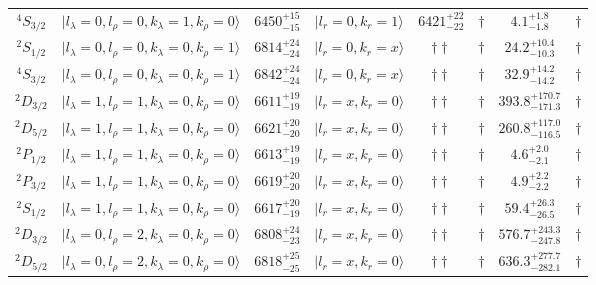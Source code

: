 \begin{tabular}{c| c c c c c c c}
$^{4}S_{3/2}$ & $\vert l_{\lambda}\!\!=\!0, l_{\rho}\!\!=\!0, k_{\lambda}\!\!=\!1, k_{\rho}\!\!=\!0 \rangle$ & $6450^{+15}_{-15}$ & $\vert l_r\!\!=\!0, k_r\!\!=\!1 \rangle$ & $6421^{+22}_{-22}$ & $\dagger$ & $4.1^{+1.8}_{-1.8}$ & $\dagger$ \\ 
$^{2}S_{1/2}$ & $\vert l_{\lambda}\!\!=\!0, l_{\rho}\!\!=\!0, k_{\lambda}\!\!=\!0, k_{\rho}\!\!=\!1 \rangle$ & $6814^{+24}_{-24}$ & $\vert l_r\!\!=\!0, k_r\!\!=\!x \rangle$ & $\dagger\dagger$ & $\dagger$ & $24.2^{+10.4}_{-10.3}$ & $\dagger$ \\ 
$^{4}S_{3/2}$ & $\vert l_{\lambda}\!\!=\!0, l_{\rho}\!\!=\!0, k_{\lambda}\!\!=\!0, k_{\rho}\!\!=\!1 \rangle$ & $6842^{+24}_{-24}$ & $\vert l_r\!\!=\!0, k_r\!\!=\!x \rangle$ & $\dagger\dagger$ & $\dagger$ & $32.9^{+14.2}_{-14.2}$ & $\dagger$ \\ 
$^{2}D_{3/2}$ & $\vert l_{\lambda}\!\!=\!1, l_{\rho}\!\!=\!1, k_{\lambda}\!\!=\!0, k_{\rho}\!\!=\!0 \rangle$ & $6611^{+19}_{-19}$ & $\vert l_r\!\!=\!x, k_r\!\!=\!0 \rangle$ & $\dagger\dagger$ & $\dagger$ & $393.8^{+170.7}_{-171.3}$ & $\dagger$ \\ 
$^{2}D_{5/2}$ & $\vert l_{\lambda}\!\!=\!1, l_{\rho}\!\!=\!1, k_{\lambda}\!\!=\!0, k_{\rho}\!\!=\!0 \rangle$ & $6621^{+20}_{-20}$ & $\vert l_r\!\!=\!x, k_r\!\!=\!0 \rangle$ & $\dagger\dagger$ & $\dagger$ & $260.8^{+117.0}_{-116.5}$ & $\dagger$ \\ 
$^{2}P_{1/2}$ & $\vert l_{\lambda}\!\!=\!1, l_{\rho}\!\!=\!1, k_{\lambda}\!\!=\!0, k_{\rho}\!\!=\!0 \rangle$ & $6613^{+19}_{-19}$ & $\vert l_r\!\!=\!x, k_r\!\!=\!0 \rangle$ & $\dagger\dagger$ & $\dagger$ & $4.6^{+2.0}_{-2.1}$ & $\dagger$ \\ 
$^{2}P_{3/2}$ & $\vert l_{\lambda}\!\!=\!1, l_{\rho}\!\!=\!1, k_{\lambda}\!\!=\!0, k_{\rho}\!\!=\!0 \rangle$ & $6619^{+20}_{-20}$ & $\vert l_r\!\!=\!x, k_r\!\!=\!0 \rangle$ & $\dagger\dagger$ & $\dagger$ & $4.9^{+2.2}_{-2.2}$ & $\dagger$ \\ 
$^{2}S_{1/2}$ & $\vert l_{\lambda}\!\!=\!1, l_{\rho}\!\!=\!1, k_{\lambda}\!\!=\!0, k_{\rho}\!\!=\!0 \rangle$ & $6617^{+20}_{-19}$ & $\vert l_r\!\!=\!x, k_r\!\!=\!0 \rangle$ & $\dagger\dagger$ & $\dagger$ & $59.4^{+26.3}_{-26.5}$ & $\dagger$ \\ 
$^{2}D_{3/2}$ & $\vert l_{\lambda}\!\!=\!0, l_{\rho}\!\!=\!2, k_{\lambda}\!\!=\!0, k_{\rho}\!\!=\!0 \rangle$ & $6808^{+24}_{-23}$ & $\vert l_r\!\!=\!x, k_r\!\!=\!0 \rangle$ & $\dagger\dagger$ & $\dagger$ & $576.7^{+243.3}_{-247.8}$ & $\dagger$ \\ 
$^{2}D_{5/2}$ & $\vert l_{\lambda}\!\!=\!0, l_{\rho}\!\!=\!2, k_{\lambda}\!\!=\!0, k_{\rho}\!\!=\!0 \rangle$ & $6818^{+25}_{-25}$ & $\vert l_r\!\!=\!x, k_r\!\!=\!0 \rangle$ & $\dagger\dagger$ & $\dagger$ & $636.3^{+277.7}_{-282.1}$ & $\dagger$ \\ 

\end{tabular}
